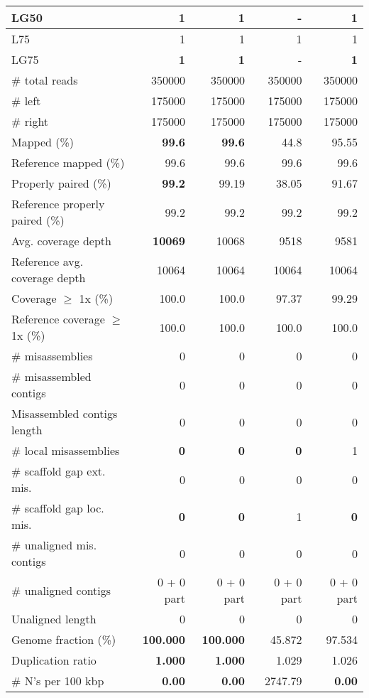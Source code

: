 \documentclass[12pt,a4paper]{article}
\begin{document}
\begin{table}[ht]
\begin{center}
\begin{tabular}{|l*{4}{|r}|}
LG50 & {\bf 1} & {\bf 1} & - & {\bf 1} \\ \hline
L75 & 1 & 1 & 1 & 1 \\ \hline
LG75 & {\bf 1} & {\bf 1} & - & {\bf 1} \\ \hline
\# total reads & 350000 & 350000 & 350000 & 350000 \\ \hline
\# left & 175000 & 175000 & 175000 & 175000 \\ \hline
\# right & 175000 & 175000 & 175000 & 175000 \\ \hline
Mapped (\%) & {\bf 99.6} & {\bf 99.6} & 44.8 & 95.55 \\ \hline
Reference mapped (\%) & 99.6 & 99.6 & 99.6 & 99.6 \\ \hline
Properly paired (\%) & {\bf 99.2} & 99.19 & 38.05 & 91.67 \\ \hline
Reference properly paired (\%) & 99.2 & 99.2 & 99.2 & 99.2 \\ \hline
Avg. coverage depth & {\bf 10069} & 10068 & 9518 & 9581 \\ \hline
Reference avg. coverage depth & 10064 & 10064 & 10064 & 10064 \\ \hline
Coverage $\geq$ 1x (\%) & 100.0 & 100.0 & 97.37 & 99.29 \\ \hline
Reference coverage $\geq$ 1x (\%) & 100.0 & 100.0 & 100.0 & 100.0 \\ \hline
\# misassemblies & 0 & 0 & 0 & 0 \\ \hline
\# misassembled contigs & 0 & 0 & 0 & 0 \\ \hline
Misassembled contigs length & 0 & 0 & 0 & 0 \\ \hline
\# local misassemblies & {\bf 0} & {\bf 0} & {\bf 0} & 1 \\ \hline
\# scaffold gap ext. mis. & 0 & 0 & 0 & 0 \\ \hline
\# scaffold gap loc. mis. & {\bf 0} & {\bf 0} & 1 & {\bf 0} \\ \hline
\# unaligned mis. contigs & 0 & 0 & 0 & 0 \\ \hline
\# unaligned contigs & 0 + 0 part & 0 + 0 part & 0 + 0 part & 0 + 0 part \\ \hline
Unaligned length & 0 & 0 & 0 & 0 \\ \hline
Genome fraction (\%) & {\bf 100.000} & {\bf 100.000} & 45.872 & 97.534 \\ \hline
Duplication ratio & {\bf 1.000} & {\bf 1.000} & 1.029 & 1.026 \\ \hline
\# N's per 100 kbp & {\bf 0.00} & {\bf 0.00} & 2747.79 & {\bf 0.00} \\ \hline

\end{tabular}
\end{center}
\end{table}
\end{document}
